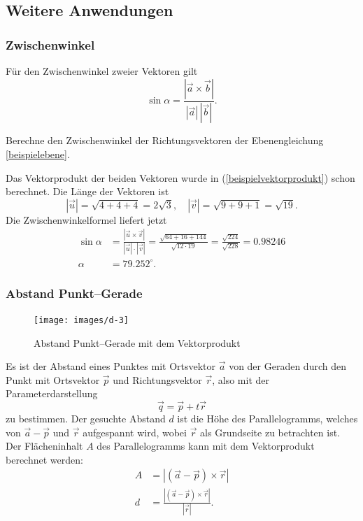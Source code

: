 \subsection{Weitere Anwendungen}

\subsubsection{Zwischenwinkel}
Für den Zwischenwinkel zweier Vektoren gilt
\[
\sin\alpha=\frac{|\vec a\times\vec b|}{|\vec a|\,|\vec b|}.
\]
\begin{beispiel}
Berechne den Zwischenwinkel der Richtungsvektoren der Ebenengleichung
\ref{beispielebene}.

\smallskip

{\parindent 0pt Das Vektorprodukt der beiden Vektoren wurde
in (\ref{beispielvektorprodukt}) schon
berechnet.} Die Länge der Vektoren ist
\[
|\vec u|=\sqrt{4+4+4}=2\sqrt{3}
,
\quad
|\vec v|=\sqrt{9+9+1}=\sqrt{19}.
\]
Die Zwischenwinkelformel liefert jetzt
\begin{align*}
\sin\alpha&=\frac{|\vec u\times \vec v|}{|\vec u|\cdot |\vec v|}
=\frac{\sqrt{64+16+144}}{\sqrt{12\cdot 19}}
=\frac{\sqrt{224}}{\sqrt{228}}=0.98246\\
\alpha&=79.252^\circ.
\end{align*}
\end{beispiel}

\subsubsection{Abstand Punkt--Gerade}
\begin{figure}
\begin{center}
\texttt{[image: images/d-3]}
\end{center}
\caption{Abstand Punkt--Gerade mit dem Vektorprodukt\label{punkt-gerade}}
\end{figure}
Es ist der Abstand eines Punktes mit Ortsvektor $\vec a$ von der
Geraden durch den Punkt mit Ortsvektor $\vec p$ und Richtungsvektor $\vec r$,
also mit der Parameterdarstellung
\[
\vec q=\vec p+t\vec r
\]
zu bestimmen.
Der gesuchte Abstand $d$ ist die Höhe des Parallelogramms,
welches von $\vec a-\vec p$
und $\vec r$ aufgespannt wird, wobei $\vec r$ als Grundseite zu betrachten ist.
Der Flächeninhalt $A$ des Parallelogramms kann mit dem Vektorprodukt
berechnet werden:
\begin{align*}
A&=|(\vec a-\vec p)\times\vec r|\\
d&=\frac{|(\vec a-\vec p)\times\vec r|}{|\vec r|}.
\end{align*}
